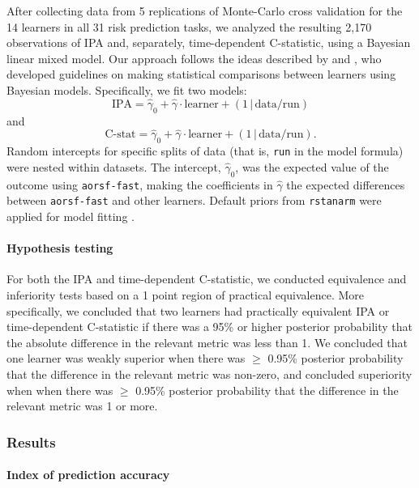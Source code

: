 \documentclass[twoside,11pt]{article}\usepackage[]{graphicx}\usepackage[]{xcolor}
\newcommand{\ie}{that is}
\begin{document}
After collecting data from 5 replications of Monte-Carlo cross validation for the 14 learners in all 31 risk prediction tasks, we analyzed the resulting 2,170 observations of IPA and, separately, time-dependent C-statistic, using a Bayesian linear mixed model. Our approach follows the ideas described by \citet{benavoli2017time} and \citet{tidymodels}, who developed guidelines on making statistical comparisons between learners using Bayesian models. Specifically, we fit two models: $$\text{IPA} = \widehat{\gamma}_0 + \widehat{\gamma} \cdot \text{learner} + (1\,|\, \text{data/run}) $$ and $$\text{C-stat} = \widehat{\gamma}_0 + \widehat{\gamma} \cdot \text{learner} + (1\,|\, \text{data/run}).$$ Random intercepts for specific splits of data (\ie, \texttt{run} in the model formula) were nested within datasets. The intercept, $\widehat{\gamma}_0$, was the expected value of the outcome using \texttt{aorsf-fast}, making the coefficients in $\widehat{\gamma}$ the expected differences between \texttt{aorsf-fast} and other learners. Default priors from \texttt{rstanarm} were applied for model fitting \citep{rstanarm}.

\paragraph{Hypothesis testing} For both the IPA and time-dependent C-statistic, we conducted equivalence and inferiority tests based on a 1 point region of practical equivalence. More specifically, we concluded that two learners had practically equivalent IPA or time-dependent C-statistic if there was a 95\% or higher posterior probability that the absolute difference in the relevant metric was less than 1. We concluded that one learner was weakly superior when there was $\geq$ 0.95\% posterior probability that the difference in the relevant metric was non-zero, and concluded superiority when when there was $\geq$ 0.95\% posterior probability that the difference in the relevant metric was 1 or more.




\subsubsection{Results} \label{sec:results_pred}

\paragraph{Index of prediction accuracy}
\end{document}
